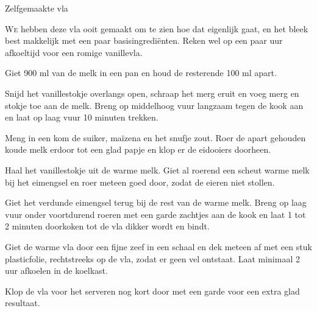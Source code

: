 \begin{recipe}{Zelfgemaakte vla}


\lettrine{W}{e} hebben deze vla ooit gemaakt om te zien hoe dat eigenlijk gaat, en
het bleek best makkelijk met een paar basisingrediënten. Reken wel op een paar
uur afkoeltijd voor een romige vanillevla.

\begin{ingredients}
\end{ingredients}

\begin{steps}
  \item Giet 900 ml van de melk in een pan en houd de resterende 100 ml apart.
  \item Snijd het vanillestokje overlangs open, schraap het merg eruit en
        voeg merg en stokje toe aan de melk. Breng op middelhoog vuur
        langzaam tegen de kook aan en laat op laag vuur 10 minuten trekken.
  \item Meng in een kom de suiker, maïzena en het snufje zout. Roer de apart
        gehouden koude melk erdoor tot een glad papje en klop er de
        eidooiers doorheen.
  \item Haal het vanillestokje uit de warme melk. Giet al roerend een scheut
        warme melk bij het eimengsel en roer meteen goed door, zodat de
        eieren niet stollen.
  \item Giet het verdunde eimengsel terug bij de rest van de warme melk.
        Breng op laag vuur onder voortdurend roeren met een garde zachtjes
        aan de kook en laat 1 tot 2 minuten doorkoken tot de vla dikker
        wordt en bindt.
  \item Giet de warme vla door een fijne zeef in een schaal en dek meteen af
        met een stuk plasticfolie, rechtstreeks op de vla, zodat er geen vel
        ontstaat. Laat minimaal 2 uur afkoelen in de koelkast.
  \item Klop de vla voor het serveren nog kort door met een garde voor een
        extra glad resultaat.
\end{steps}
\end{recipe}
